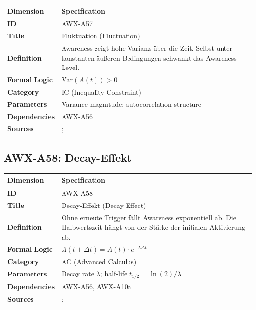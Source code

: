 \begin{table}[htbp]
\small
\begin{tabular}{p{3cm}p{11cm}}
\toprule
\textbf{Dimension} & \textbf{Specification} \\
\midrule
\textbf{ID} & AWX-A57 \\
\textbf{Title} & Fluktuation (Fluctuation) \\
\textbf{Definition} & Awareness zeigt hohe Varianz über die Zeit. Selbst unter konstanten äußeren Bedingungen schwankt das Awareness-Level. \\
\textbf{Formal Logic} & $\text{Var}(A(t)) > 0$ \\
\textbf{Category} & IC (Inequality Constraint) \\
\textbf{Parameters} & Variance magnitude; autocorrelation structure \\
\textbf{Dependencies} & AWX-A56 \\
\textbf{Sources} & \citet{PAP-kahneman2003maps}; \citet{csikszentmihalyi1987validity} \\
\bottomrule
\end{tabular}
\end{table}


\subsection{AWX-A58: Decay-Effekt}

\begin{table}[htbp]
\small
\begin{tabular}{p{3cm}p{11cm}}
\toprule
\textbf{Dimension} & \textbf{Specification} \\
\midrule
\textbf{ID} & AWX-A58 \\
\textbf{Title} & Decay-Effekt (Decay Effect) \\
\textbf{Definition} & Ohne erneute Trigger fällt Awareness exponentiell ab. Die Halbwertszeit hängt von der Stärke der initialen Aktivierung ab. \\
\textbf{Formal Logic} & $A(t + \Delta t) = A(t) \cdot e^{-\lambda \Delta t}$ \\
\textbf{Category} & AC (Advanced Calculus) \\
\textbf{Parameters} & Decay rate $\lambda$; half-life $t_{1/2} = \ln(2)/\lambda$ \\
\textbf{Dependencies} & AWX-A56, AWX-A10a \\
\textbf{Sources} & \citet{ebbinghaus1885memory}; \citet{wixted2004psychology} \\
\bottomrule
\end{tabular}
\end{table}

